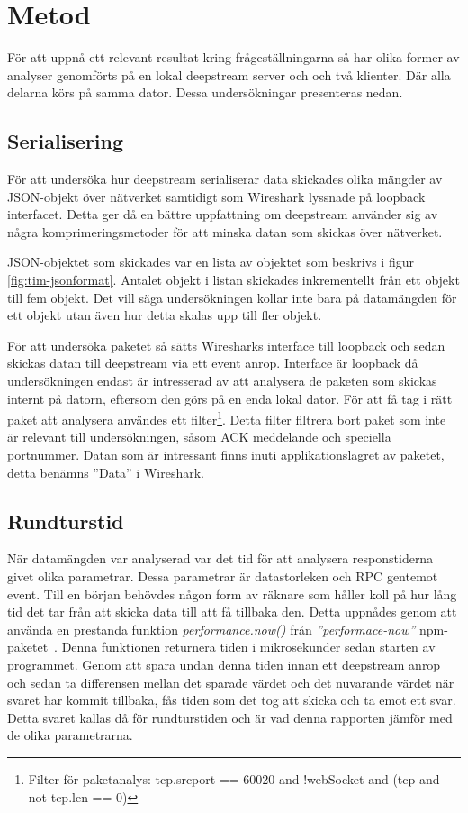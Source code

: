 \section{Metod}
\label{sec:tim-method}
För att uppnå ett relevant resultat kring frågeställningarna så har olika former av analyser genomförts på en lokal deepstream server och och två klienter. Där alla delarna körs på samma dator. Dessa undersökningar presenteras nedan.

\subsection{Serialisering}
\label{subsec:tim-method-serializing}
För att undersöka hur deepstream serialiserar data skickades olika mängder av JSON-objekt över nätverket samtidigt som Wireshark lyssnade på loopback interfacet. Detta ger då en bättre uppfattning om deepstream använder sig av några komprimeringsmetoder för att minska datan som skickas över nätverket.

JSON-objektet som skickades var en lista av objektet som beskrivs i figur \ref{fig:tim-jsonformat}. Antalet objekt i listan skickades inkrementellt från ett objekt till fem objekt. Det vill säga undersökningen kollar inte bara på datamängden för ett objekt utan även hur detta skalas upp till fler objekt. 

För att undersöka paketet så sätts Wiresharks interface till loopback och sedan skickas datan till deepstream via ett event anrop. Interface är loopback då undersökningen endast är intresserad av att analysera de paketen som skickas internt på datorn, eftersom den görs på en enda lokal dator. För att få tag i rätt paket att analysera användes ett filter\footnote{Filter för paketanalys: tcp.srcport == 60020 and !webSocket and (tcp and not tcp.len == 0)}. Detta filter filtrera bort paket som inte är relevant till undersökningen, såsom ACK meddelande och speciella portnummer. Datan som är intressant finns inuti applikationslagret av paketet, detta benämns ''Data'' i Wireshark.

\subsection{Rundturstid}
\label{subsec:tim-method-response}
När datamängden var analyserad var det tid för att analysera responstiderna givet olika parametrar. Dessa parametrar är datastorleken och RPC gentemot event. Till en början behövdes någon form av räknare som håller koll på hur lång tid det tar från att skicka data till att få tillbaka den. Detta uppnådes genom att använda en prestanda funktion \textit{performance.now()} från \textit{''performace-now''} npm-paketet~\cite{performance-now}. Denna funktionen returnera tiden i mikrosekunder sedan starten av programmet. Genom att spara undan denna tiden innan ett deepstream anrop och sedan ta differensen mellan det sparade värdet och det nuvarande värdet när svaret har kommit tillbaka, fås tiden som det tog att skicka och ta emot ett svar. Detta svaret kallas då för rundturstiden och är vad denna rapporten jämför med de olika parametrarna. 

